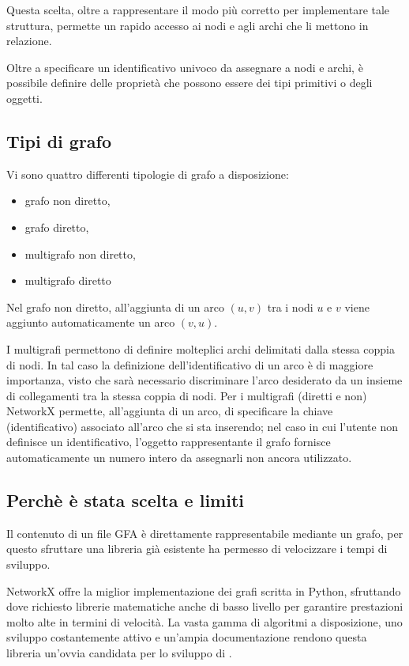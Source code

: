 Questa scelta, oltre a rappresentare il modo più corretto per
implementare tale struttura\cite{python-graph}, permette un rapido
accesso ai nodi e agli archi che li mettono in relazione.

Oltre a specificare un identificativo univoco da assegnare a nodi e archi,
è possibile definire delle proprietà che possono essere dei tipi primitivi
o degli oggetti.

\subsection{Tipi di grafo}
Vi sono quattro differenti tipologie di grafo a disposizione:
\begin{itemize}
	\item grafo non diretto,
	\item grafo diretto,
	\item multigrafo non diretto,
	\item multigrafo diretto
\end{itemize}
Nel grafo non diretto, all'aggiunta di un arco $(u, v)$ tra
i nodi $u$ e $v$ viene aggiunto automaticamente un
arco $(v, u)$.

I multigrafi permettono di definire molteplici archi delimitati dalla
stessa coppia di nodi. In tal caso la definizione dell'identificativo
di un arco è di maggiore importanza, visto che sarà necessario
discriminare l'arco desiderato da un insieme di collegamenti
tra la stessa coppia di nodi. Per i multigrafi (diretti e non)
NetworkX permette, all'aggiunta di un arco, di specificare la chiave
(identificativo) associato all'arco che si sta inserendo; nel caso in cui
l'utente non definisce un identificativo, l'oggetto rappresentante il grafo
fornisce automaticamente un numero intero da assegnarli non ancora
utilizzato.

\subsection{Perchè è stata scelta e limiti}
\label{sec:nx-why-limits}
Il contenuto di un file GFA è direttamente rappresentabile mediante
un grafo, per questo sfruttare una libreria già esistente ha permesso
di velocizzare i tempi di sviluppo.

NetworkX offre la miglior implementazione dei grafi scritta in Python,
sfruttando dove richiesto librerie matematiche anche di basso livello
per garantire prestazioni molto alte in termini di velocità. La vasta
gamma di algoritmi a disposizione, uno sviluppo costantemente
attivo\cite{networkx-github} e un'ampia documentazione rendono
questa libreria un'ovvia candidata per lo sviluppo di \pygfa.

